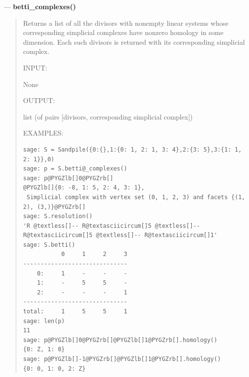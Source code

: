 \documentclass[letterpaper,10pt,english]{manual}
\begin{document}
---
\hypertarget{betti-complexes}{}
\textbf{betti\_complexes()}
\begin{quote}

Returns a list of all the divisors with nonempty linear systems whose
corresponding simplicial complexes have nonzero homology in some
dimension. Each such divisors is returned with its corresponding
simplicial complex.

INPUT:

None

OUTPUT:

list (of pairs {[}divisors, corresponding simplicial complex{]})

EXAMPLES:

\begin{Verbatim}[commandchars=@\[\]]
sage: S = Sandpile({0:{},1:{0: 1, 2: 1, 3: 4},2:{3: 5},3:{1: 1, 2: 1}},0)
sage: p = S.betti@_complexes()
sage: p@PYGZlb[]0@PYGZrb[]
@PYGZlb[]{0: -8, 1: 5, 2: 4, 3: 1},
 Simplicial complex with vertex set (0, 1, 2, 3) and facets {(1, 2), (3,)}@PYGZrb[]
sage: S.resolution()
'R @textless[]-- R@textasciicircum[]5 @textless[]-- R@textasciicircum[]5 @textless[]-- R@textasciicircum[]1'
sage: S.betti()
           0     1     2     3
------------------------------
    0:     1     -     -     -
    1:     -     5     5     -
    2:     -     -     -     1
------------------------------
total:     1     5     5     1
sage: len(p)
11
sage: p@PYGZlb[]0@PYGZrb[]@PYGZlb[]1@PYGZrb[].homology()
{0: Z, 1: 0}
sage: p@PYGZlb[]-1@PYGZrb[]@PYGZlb[]1@PYGZrb[].homology()
{0: 0, 1: 0, 2: Z}
\end{Verbatim}
\end{quote}
\end{document}
